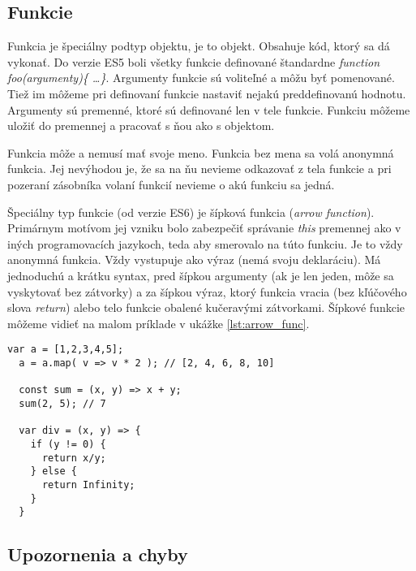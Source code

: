 \subsection{Funkcie}
\label{subsec:JSfunctions}
Funkcia je špeciálny podtyp objektu, je to  objekt. Obsahuje kód, ktorý sa dá vykonať. 
Do verzie ES5 boli všetky funkcie definované štandardne \emph{function foo(argumenty)\{ \ldots \}}. Argumenty funkcie sú voliteľné a môžu byť pomenované. Tiež im môžeme pri definovaní funkcie nastaviť nejakú preddefinovanú hodnotu. 
Argumenty sú premenné, ktoré sú definované len v tele funkcie. Funkciu môžeme uložiť do premennej a pracovať s ňou ako s objektom.

Funkcia môže a nemusí mať svoje meno. Funkcia bez mena sa volá anonymná funkcia. Jej nevýhodou je, že sa na ňu nevieme odkazovať z tela funkcie a pri pozeraní zásobníka volaní funkcií nevieme o akú funkciu sa jedná.

Špeciálny typ funkcie (od verzie ES6) je šípková funkcia (\emph{arrow function}). Primárnym motívom jej vzniku bolo zabezpečiť správanie \emph{this} premennej ako v iných programovacích jazykoch, teda aby smerovalo na túto funkciu. 
Je to vždy anonymná funkcia. Vždy vystupuje ako výraz (nemá svoju deklaráciu). Má jednoduchú a krátku syntax, pred šípkou argumenty (ak je len jeden, môže sa vyskytovať bez zátvorky) a za šípkou výraz, ktorý funkcia vracia (bez kľúčového slova \emph{return}) alebo telo funkcie obalené kučeravými zátvorkami. Šípkové funkcie môžeme vidieť na malom príklade v ukážke \ref{lst:arrow_func}.

\begin{lstlisting}[caption=šípkové funkcie, label={lst:arrow_func}]
  var a = [1,2,3,4,5];
  a = a.map( v => v * 2 ); // [2, 4, 6, 8, 10]

  const sum = (x, y) => x + y;
  sum(2, 5); // 7

  var div = (x, y) => {
    if (y != 0) {
      return x/y;
    } else {
      return Infinity;
    }
  }
\end{lstlisting}

\subsection{Upozornenia a chyby}

